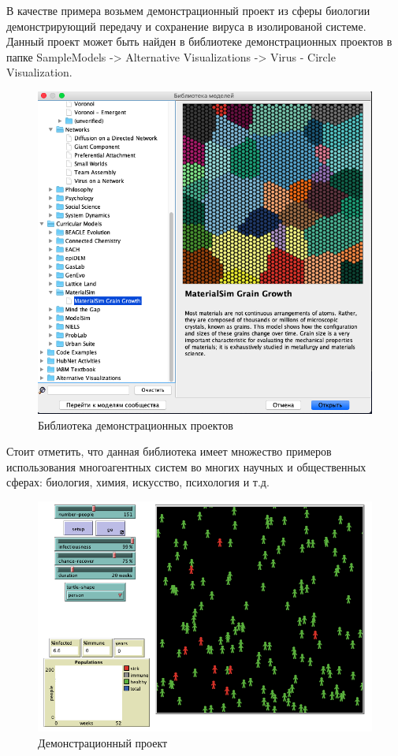 \documentclass[14pt,a4paper,report]{report}
\begin{document}
В качестве примера возьмем демонстрационный проект из сферы биологии демонстрирующий передачу и сохранение вируса в изолированой системе. Данный проект может быть найден в библиотеке демонстрационных проектов в папке SampleModels -> Alternative Visualizations -> Virus - Circle Visualization.
\clearpage
\begin{figure}[h!]
	\centering
	\includegraphics[scale = 0.60]{images/2.png}
	\caption{Библиотека демонстрационных проектов}
\end{figure}

Стоит отметить, что данная библиотека имеет множество примеров использования многоагентных систем во многих научных и общественных сферах: биология, химия, искусство, психология и т.д.

\begin{figure}[h!]
	\centering
	\includegraphics[scale = 0.60]{images/3_1.png}
	\caption{Демонстрационный проект}
\end{figure}
\end{document}

